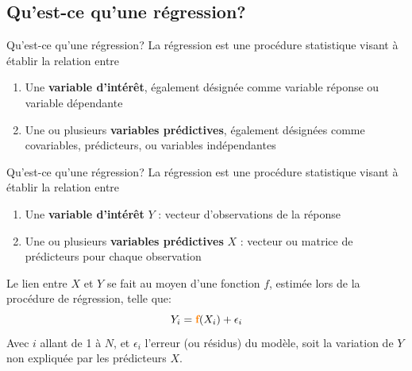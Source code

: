 

\subsection{Qu'est-ce qu'une régression?}

	\begin{frame}{Qu'est-ce qu'une régression?}
	La régression est une procédure statistique visant à établir la relation entre
	
		\begin{enumerate}
		    \item Une \textbf{variable d'intérêt}, également désignée comme variable réponse ou variable dépendante
		    
		    \item Une ou plusieurs \textbf{variables prédictives}, également désignées comme covariables, prédicteurs, ou variables indépendantes
		\end{enumerate}
	\end{frame}
	
	
	\begin{frame}{Qu'est-ce qu'une régression?}
	La régression est une procédure statistique visant à établir la relation entre
	
		\begin{enumerate}
		    \item Une \textbf{variable d'intérêt} $Y$ : vecteur d'observations de la réponse
		    
		    \item Une ou plusieurs \textbf{variables prédictives} $X$ :  vecteur ou matrice de prédicteurs pour chaque observation
		\end{enumerate}
		Le lien entre $X$ et $Y$ se fait au moyen d'une fonction $f$, estimée lors de la procédure de régression, telle que:
		\Large
		\begin{equation*}
		    Y_i = \textcolor{orange}{\textbf{f}}(X_i) + \epsilon_i
		\end{equation*}
		\small
		Avec $i$ allant de 1 à $N$, et $\epsilon_i$ l'erreur (ou résidus) du modèle, soit la variation de $Y$ non expliquée par les prédicteurs $X$.

	\end{frame}
	
